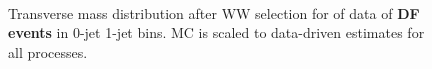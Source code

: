\begin{figure}[!hbtp]
\centering
{}
 \\
\caption{Transverse mass distribution after WW selection for \intlumiEightTeV of data 
of {\bf DF events} in 0-jet  1-jet  bins.   
MC is scaled to data-driven estimates for all processes.}
\label{fig:ww_mt}
\end{figure}

